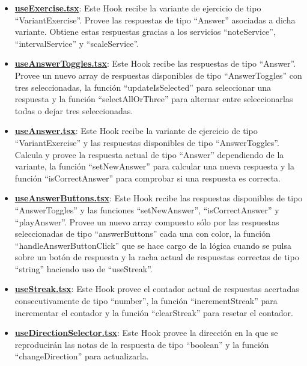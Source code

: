 \documentclass[12pt,twoside,titlepage]{report}
\begin{document}
\begin{itemize}
    \item \href{https://github.com/alberttogoca/EarFit/blob/main/src/hooks/useExercise.tsx}{\textbf{useExercise.tsx}}: Este Hook recibe la variante de ejercicio de tipo ``VariantExercise''. Provee las respuestas de tipo ``Answer\text{[]}'' asociadas a dicha variante. Obtiene estas respuestas gracias a los servicios ``noteService'', ``intervalService'' y ``scaleService''.
    \item \href{https://github.com/alberttogoca/EarFit/blob/main/src/hooks/useAnswerToggles.tsx}{\textbf{useAnswerToggles.tsx}}: Este Hook recibe las respuestas de tipo ``Answer\text{[]}''. Provee un nuevo array de respuestas disponibles de tipo ``AnswerToggles\text{[]}'' con tres seleccionadas, la función ``updateIsSelected'' para seleccionar una respuesta y la función ``selectAllOrThree'' para alternar entre seleccionarlas todas o dejar tres seleccionadas.
    \item \href{https://github.com/alberttogoca/EarFit/blob/main/src/hooks/useAnswer.tsx}{\textbf{useAnswer.tsx}}: Este Hook recibe la variante de ejercicio de tipo ``VariantExercise'' y las respuestas disponibles de tipo ``AnswerToggles\text{[]}''. Calcula y provee la respuesta actual de tipo ``Answer'' dependiendo de la variante, la función ``setNewAnswer'' para calcular una nueva respuesta y la función ``isCorrectAnswer'' para comprobar si una respuesta es correcta.
    \item \href{https://github.com/alberttogoca/EarFit/blob/main/src/hooks/useAnswerButtons.tsx}{\textbf{useAnswerButtons.tsx}}:  Este Hook recibe las respuestas disponibles de tipo ``AnswerToggles\text{[]}'' y las funciones ``setNewAnswer'', ``isCorrectAnswer'' y ``playAnswer''. Provee un nuevo array compuesto sólo por las respuestas seleccionadas de tipo ``answerButtons\text{[]}'' cada una con color, la función ``handleAnswerButtonClick'' que se hace cargo de la lógica cuando se pulsa sobre un botón de respuesta y la racha actual de respuestas correctas de tipo ``string'' haciendo uso de ``useStreak''.
    \item \href{https://github.com/alberttogoca/EarFit/blob/main/src/hooks/useStreak.tsx}{\textbf{useStreak.tsx}}: Este Hook provee el contador actual de respuestas acertadas consecutivamente de tipo ``number'', la función ``incrementStreak'' para incrementar el contador y la función ``clearStreak'' para resetar el contador.
    \item \href{https://github.com/alberttogoca/EarFit/blob/main/src/hooks/useDirectionSelector.tsx}{\textbf{useDirectionSelector.tsx}}: Este Hook provee la dirección en la que se reproducirán las notas de la respuesta de tipo ``boolean'' y la función ``changeDirection'' para actualizarla.

\end{itemize}
\end{document}
